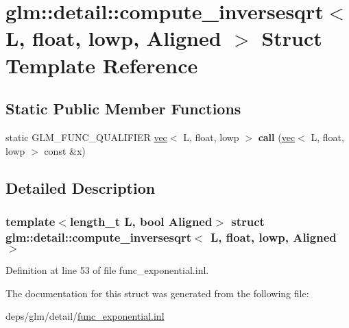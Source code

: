 \hypertarget{structglm_1_1detail_1_1compute__inversesqrt_3_01L_00_01float_00_01lowp_00_01Aligned_01_4}{}\section{glm\+:\+:detail\+:\+:compute\+\_\+inversesqrt$<$ L, float, lowp, Aligned $>$ Struct Template Reference}
\label{structglm_1_1detail_1_1compute__inversesqrt_3_01L_00_01float_00_01lowp_00_01Aligned_01_4}
\subsection*{Static Public Member Functions}
\begin{DoxyCompactItemize}
\item 
\mbox{\label{structglm_1_1detail_1_1compute__inversesqrt_3_01L_00_01float_00_01lowp_00_01Aligned_01_4_afac251e9e18084ffd62fe54d0c2c0a32}} 
static G\+L\+M\+\_\+\+F\+U\+N\+C\+\_\+\+Q\+U\+A\+L\+I\+F\+I\+ER \hyperlink{structglm_1_1vec}{vec}$<$ L, float, lowp $>$ {\bfseries call} (\hyperlink{structglm_1_1vec}{vec}$<$ L, float, lowp $>$ const \&x)
\end{DoxyCompactItemize}


\subsection{Detailed Description}
\subsubsection*{template$<$length\+\_\+t L, bool Aligned$>$\newline
struct glm\+::detail\+::compute\+\_\+inversesqrt$<$ L, float, lowp, Aligned $>$}



Definition at line 53 of file func\+\_\+exponential.\+inl.



The documentation for this struct was generated from the following file\+:\begin{DoxyCompactItemize}
\item 
deps/glm/detail/\hyperlink{func__exponential_8inl}{func\+\_\+exponential.\+inl}\end{DoxyCompactItemize}
